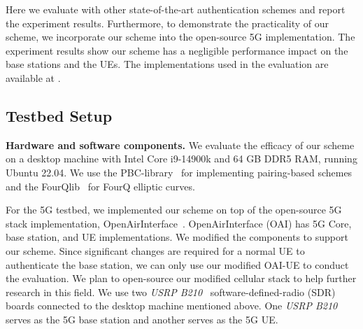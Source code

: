Here we evaluate \scheme{} with other state-of-the-art authentication schemes and report the experiment results. 
Furthermore, to demonstrate the practicality of our scheme, we incorporate our scheme into the open-source 5G implementation. The experiment results show our scheme has a negligible performance impact on the base stations and the UEs. 
The implementations used in the evaluation are available at \cite{E2IBS-github}. 
\subsection{Testbed Setup}

\noindent \textbf{Hardware and software components.}
We evaluate the efficacy of our scheme on a desktop machine with Intel Core i9-14900k and 64 GB DDR5 RAM, running Ubuntu 22.04. We use the PBC-library~\cite{pbc} for implementing pairing-based schemes and the FourQlib~\cite{fourqlib} for FourQ elliptic curves.

For the 5G testbed, we implemented our scheme on top of the open-source 5G stack implementation, OpenAirInterface~\cite{openAirInterface}. OpenAirInterface (OAI) has 5G Core, base station, and UE implementations. We modified the components to support our scheme. Since significant changes are required for a normal UE to authenticate the base station, we can only use our modified OAI-UE to conduct the evaluation. We plan to open-source our modified cellular stack to help further research in this field. We use two \textit{USRP B210}~\cite{USRP_B210} software-defined-radio (SDR) boards connected to the desktop machine mentioned above. One \textit{USRP B210} serves as the 5G base station and another serves as the 5G UE.

